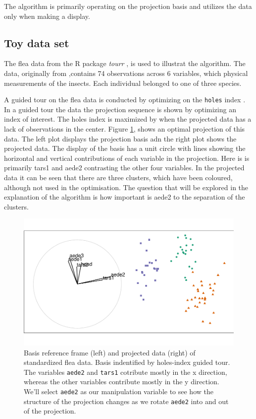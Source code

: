 \documentclass{monashthesis}
\begin{document}
The algorithm is primarily operating on the projection basis and
utilizes the data only when making a display.

\subsection{Toy data set}\label{toy-data-set}

The flea data from the R package \emph{tourr}
\autocite{wickham_tourr_2011}, is used to illustrat the algorithm. The
data, originally from \textcite{lubischew_use_1962},contains 74
observations across 6 variables, which physical measurements of the
insects. Each individual belonged to one of three species.

A guided tour on the flea data is conducted by optimizing on the
\texttt{holes} index \autocite{cook_interactive_2007}. In a guided tour
the data the projection sequence is shown by optimizing an index of
interest. The holes index is maximized by when the projected data has a
lack of observations in the center. Figure \ref{fig:step0}, shows an
optimal projection of this data. The left plot displays the projection
basis adn the right plot shows the projected data. The display of the
basis has a unit circle with lines showing the horizontal and vertical
contributions of each variable in the projection. Here is is primarily
tars1 and aede2 contrasting the other four variables. In the projected
data it can be seen that there are three clusters, which have been
coloured, although not used in the optimisation. The question that will
be explored in the explanation of the algorithm is how important is
aede2 to the separation of the clusters.

\begin{figure}
\centering
\includegraphics{thesis_files/figure-latex/step0-1.pdf}
\caption{\label{fig:step0}Basis reference frame (left) and projected data
(right) of standardized flea data. Basis indentified by holes-index
guided tour. The variables \texttt{aede2} and \texttt{tars1} cotribute
mostly in the x direction, whereas the other variables contribute mostly
in the y direction. We'll select \texttt{aede2} as our manipulation
variable to see how the structure of the projection changes as we rotate
\texttt{aede2} into and out of the projection.}
\end{figure}
\end{document}
